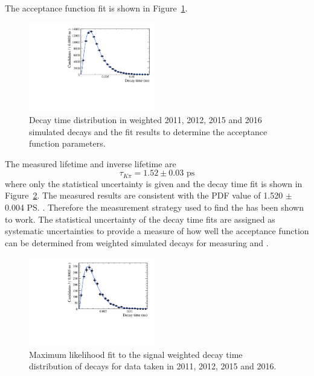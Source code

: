 The acceptance function fit is shown in Figure~\ref{fig:bdkpiacceptancefit}. 

\begin{figure}[htbp]
\centering
  \includegraphics[width=0.49\textwidth]{./Figs/LifetimeSystematics/Bd2KPi_accetpance_fit.pdf}
\caption{Decay time distribution in weighted 2011, 2012, 2015 and 2016 simulated decays and the \ml fit results to determine the acceptance function parameters. }
\label{fig:bdkpiacceptancefit}
\end{figure}

The measured \bdkpi lifetime and inverse lifetime are
\begin{equation}
\tau_{K\pi} = 1.52 \pm 0.03  \text{ ps} 
\end{equation}
where only the statistical uncertainty is given and the decay time fit is shown in Figure~\ref{fig:bdkpilifetimefit}. The measured results are consistent with the PDF value of 1.520 $\pm$ 0.004 \ps. Therefore the measurement strategy used to find the \bsmumu \el has been shown to work. The statistical uncertainty of the \bdkpi decay time fits are assigned as systematic uncertainties to provide a measure of how well the acceptance function can be determined from weighted simulated decays for measuring \tmumu and \Gmumu. 

\begin{figure}[htbp]
\centering
  \includegraphics[width=0.49\textwidth]{./Figs/LifetimeSystematics/Bd2KPi_lifetime_fit.pdf}
\caption{Maximum likelihood fit to the signal weighted decay time distribution of \bdkpi decays for data taken in 2011, 2012, 2015 and 2016. }
\label{fig:bdkpilifetimefit}
\end{figure}

